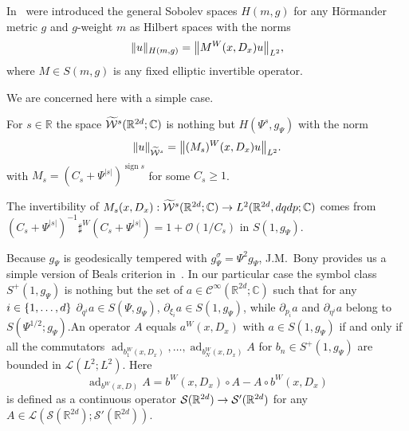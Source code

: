 \documentclass[AHL,Unicode,longabstracts]{cedram}
\newcommand{\C}{\mathbb{C}}
\newcommand{\R}{\mathbb{R}}
\newcommand{\clW}{\mathcal{W}}
\newcommand{\clC}{\mathcal{C}}
\newcommand{\clO}{\mathcal{O}}
\newcommand{\clS}{\mathcal{S}}
\newcommand{\clL}{\mathcal{L}}
\DeclareMathOperator{\ssign}{sign}
\DeclareMathOperator{\add}{ad}
\let\oldtilde\tilde
\renewcommand*{\tilde}[1]{\mathchoice{\widetilde{#1}}{\widetilde{#1}}{\oldtilde{#1}}{\oldtilde{#1}}}
\let\originalleft\left
\let\originalright\right
\renewcommand{\left}{\mathopen{}\mathclose\bgroup\originalleft}
\renewcommand{\right}{\aftergroup\egroup\originalright}
\renewcommand*{\to}{\mathchoice{\longrightarrow}{\rightarrow}{\rightarrow}{\rightarrow}}
\begin{document}
In~\cite{BoCh} were introduced the general Sobolev spaces $H(m,g)$ for any H\"ormander metric $g$ and $g$-weight $m$ as Hilbert spaces with the norms
\[
\|u\|_{H(m,g)}=\left\|M^{W}(x,D_{x})u\right\|_{L^{2}},
\]
where $M\in S(m,g)$ is any fixed elliptic invertible operator.

We are concerned here with a simple case.
\begin{defi}\label{de:tWsRd}
For $s\in \R$ the space $\tilde{\clW}^{s}(\R^{2d};\C)$ is nothing but $H(\Psi^{s},g_{\Psi})$ with the norm
\[
\|u\|_{\widetilde{\clW}^{s}}=\left\|(M_{s})^{W}(x,D_{x})u\right\|_{L^{2}}.
\]
with $M_{s}=(C_{s}+\Psi^{|s|})^{\ssign s}$ for some $C_{s}\geq 1$.
\end{defi}

The invertibility of $M_{s}(x,D_{x}):\tilde{\clW}^{s}(\R^{2d};\C)\to L^{2}(\R^{2d},dqdp;\C)$ comes from $(C_{s}+\Psi^{|s|})^{-1}\sharp^{W}(C_{s}+\Psi^{|s|})=1+\clO(1/C_{s})$ in $S(1,g_{\Psi})$.

Because $g_{\Psi}$ is geodesically tempered with $g_{\Psi}^{\sigma}=\Psi^{2}g_{\Psi}$, J.M.~Bony provides us a simple version of Beals criterion in~\cite{Bon}. In our particular case the symbol class $S^{+}(1,g_{\Psi})$ is nothing but the set of $a\in \clC^{\infty}(\R^{2d};\C)$ such that for any $i\in \left\{1,\dots,d\right\}$ $\partial_{q^{i}}a\in S(\Psi,g_{\Psi})$, $\partial_{\xi_{i}}a\in S(1,g_{\Psi})$, while $\partial_{p_{i}}a$ and $\partial_{\eta^{i}}a$ belong to $S(\Psi^{1/2};g_{\Psi})$.\linebreak An operator $A$ equals $a^{W}(x,D_{x})$ with $a\in S(1,g_{\Psi})$ if and only if all the commutators $\add_{b_{1}^{W}(x,D_{x})}, \dots, \add_{b_{N}^{W}(x,D_{x})}A$ for $b_{n}\in S^{+}(1,g_{\Psi})$ are bounded in $\clL(L^{2};L^{2})$. Here
\[
\add_{b^{W}(x,D)}A=b^{W}(x,D_{x})\circ A-A\circ b^{W}(x,D_{x})
\]
is defined as a continuous operator $\clS(\R^{2d})\to \clS'(\R^{2d})$ for any $A\in \clL(\clS(\R^{2d});\clS'(\R^{2d}))$.
\end{document}
